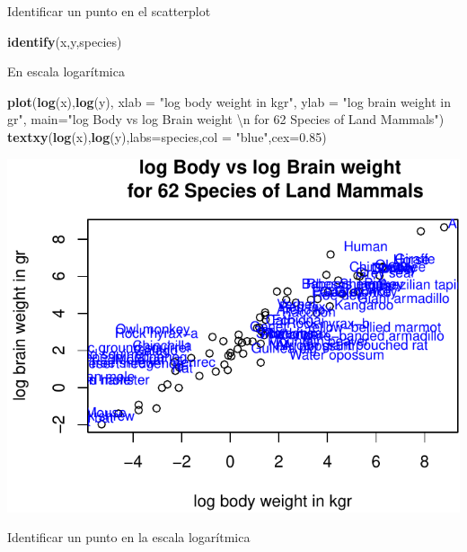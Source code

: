 \documentclass[]{article}
\newenvironment{Shaded}{\begin{snugshade}}{\end{snugshade}}
\newcommand{\KeywordTok}[1]{\textcolor[rgb]{0.13,0.29,0.53}{\textbf{{#1}}}}
\newcommand{\DataTypeTok}[1]{\textcolor[rgb]{0.13,0.29,0.53}{{#1}}}
\newcommand{\FloatTok}[1]{\textcolor[rgb]{0.00,0.00,0.81}{{#1}}}
\newcommand{\CharTok}[1]{\textcolor[rgb]{0.31,0.60,0.02}{{#1}}}
\newcommand{\StringTok}[1]{\textcolor[rgb]{0.31,0.60,0.02}{{#1}}}
\newcommand{\NormalTok}[1]{{#1}}
\numberwithin{equation}{section}
\begin{document}
Identificar un punto en el scatterplot

\begin{Shaded}
\begin{Highlighting}[]
\KeywordTok{identify}\NormalTok{(x,y,species)}
\end{Highlighting}
\end{Shaded}

En escala logarítmica

\begin{Shaded}
\begin{Highlighting}[]
\KeywordTok{plot}\NormalTok{(}\KeywordTok{log}\NormalTok{(x),}\KeywordTok{log}\NormalTok{(y), }\DataTypeTok{xlab =} \StringTok{"log body weight in kgr"}\NormalTok{, }\DataTypeTok{ylab =} \StringTok{"log brain weight in gr"}\NormalTok{, }
     \DataTypeTok{main=}\StringTok{"log Body vs log Brain weight }\CharTok{\textbackslash{}n}\StringTok{ for 62 Species of Land Mammals"}\NormalTok{)}
\KeywordTok{textxy}\NormalTok{(}\KeywordTok{log}\NormalTok{(x),}\KeywordTok{log}\NormalTok{(y),}\DataTypeTok{labs=}\NormalTok{species,}\DataTypeTok{col =} \StringTok{"blue"}\NormalTok{,}\DataTypeTok{cex=}\FloatTok{0.85}\NormalTok{) }
\end{Highlighting}
\end{Shaded}

\begin{center}\includegraphics{tema1_files/figure-latex/unnamed-chunk-79-1} \end{center}

Identificar un punto en la escala logarítmica
\end{document}
